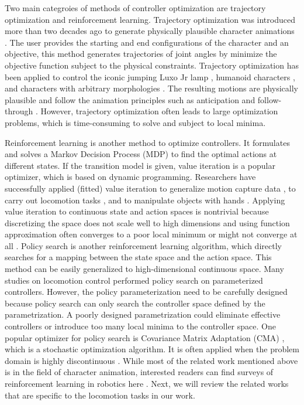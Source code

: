 Two main categroies of methods of controller optimization are trajectory optimization and reinforcement learning. Trajectory optimization was introduced more than two decades ago to generate physically plausible character animations \cite{}. The user provides the starting and end configurations of the character and an objective, this method generates trajectories of joint angles by minimize the objective function subject to the physical constraints. Trajectory optimization has been applied to control the iconic jumping Luxo Jr lamp \cite{}, humanoid characters \cite{}, and characters with arbitrary morphologies \cite{}. The resulting motions are physically plausible and follow the animation principles such as anticipation and follow-through \cite{}. However, trajectory optimization often leads to large optimization problems, which is time-consuming to solve and subject to local minima.

Reinforcement learning is another method to optimize controllers. It formulates and solves a Markov Decision Process (MDP) to find the optimal actions at different states. If the transition model is given, value iteration is a popular optimizer, which is based on dynamic programming. Researchers have successfully applied (fitted) value iteration to generalize motion capture data \cite{Treuille:2007:NCA,Levine:2012:CCC}, to carry out locomotion tasks \cite{Coros:2009:RTC}, and to manipulate objects with hands \cite{Multifinger2013}. Applying value iteration to continuous state and action spaces is nontrivial because discretizing the space does not scale well to high dimensions \cite{Sutton:1998:IRL} and using function approximation often converges to a poor local minimum or might not converge at all \cite{Thrun93issuesin,Boyan95generalizationin}. Policy search \cite{Ng:2000:PPS} is another reinforcement learning algorithm, which directly searches for a mapping between the state space and the action space. This method can be easily generalized to high-dimensional continuous space. Many studies on locomotion control \cite{Yin08,Wang:2009,Coros:2011,Wang:2012,Geijtenbeek:2013} performed policy search on parameterized controllers. However, the policy parameterization need to be carefully designed because policy search can only search the controller space defined by the parametrization. A poorly designed parametrization could eliminate effective controllers or introduce too many local minima to the controller space. One popular optimizer for policy search is Covariance Matrix Adaptation (CMA) \cite{hansen2004evaluating}, which is a stochastic optimization algorithm. It is often applied when the problem domain is highly discontinuous \cite{Wu:2010:TAB,Wang:2010:OWC,Mordatch:2010:RPL}. While most of the related work mentioned above is in the field of character animation, interested readers can find surveys of reinforcement learning in robotics here \cite{}. Next, we will review the related works that are specific to the locomotion tasks in our work.

